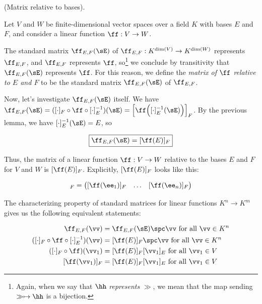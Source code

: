 \begin{deriv}
\label{ch::lin_alg::deriv::matrix_relative_to_bases}
    (Matrix relative to bases).
    
    Let $V$ and $W$ be finite-dimensional vector spaces over a field $K$ with bases $E$ and $F$, and consider a linear function $\ff:V \rightarrow W$. 
    
    The standard matrix $\ff_{E,F}(\sE)$ of $\ff_{E,F}:K^{\dim(V)} \rightarrow K^{\dim(W)}$ represents $\ff_{E,F}$, and $\ff_{E,F}$ represents $\ff$, so\footnote{Again, when we say that $\hh$ \textit{represents} $\gg$, we mean that the map sending $\gg \mapsto \hh$ is a bijection.} we conclude by transitivity that $\ff_{E,F}(\sE)$ represents $\ff$. For this reason, we define the \textit{matrix of $\ff$ relative to $E$ and $F$} to be the standard matrix $\ff_{E,F}(\sE)$ of $\ff_{E,F}$.
    
    Now, let's investigate $\ff_{E,F}(\sE)$ itself. We have $\ff_{E,F}(\sE) = ([\cdot]_F \circ \ff \circ [\cdot]_E^{-1})(\sE) = \Big[\ff\Big([\cdot]_E^{-1}(\sE)\Big)\Big]_F$. By the previous lemma, we have $[\cdot]_E^{-1}(\sE) = E$, so
    
    \begin{align*}
        \boxed
        {
            \ff_{E,F}(\sE) = [\ff(E)]_F
        }
    \end{align*}
    
    Thus, the matrix of a linear function $\ff:V \rightarrow W$ relative to the bases $E$ and $F$ for $V$ and $W$ is $[\ff(E)]_F$. Explicitly, $[\ff(E)]_F$ looks like this:
    
    \begin{align*}
        [\ff(E)]_F =
        \begin{pmatrix}
            [\ff(\ee_1)]_F & \hdots & [\ff(\ee_n)]_F
        \end{pmatrix}
    \end{align*}
    
    The characterizing property of standard matrices for linear functions $K^n \rightarrow K^m$ gives us the following equivalent statements:
    
    \begin{align*}
        \ff_{E,F}(\vv) &= \ff_{E,F}(\sE) \spc \vv \text{ for all $\vv \in K^n$} \\
        ([\cdot]_F \circ \ff \circ [\cdot]_E^{-1})(\vv) &= [\ff(E)]_F \spc \vv \text{ for all $\vv \in K^n$} \\
        ([\cdot]_F \circ \ff)(\vv_1) &= [\ff(E)]_F [\vv_1]_E \text{ for all $\vv_1 \in V$} \\
        [\ff(\vv_1)]_F &= [\ff(E)]_F [\vv_1]_E \text{ for all $\vv_1 \in V$}
    \end{align*}
    

\end{deriv}
